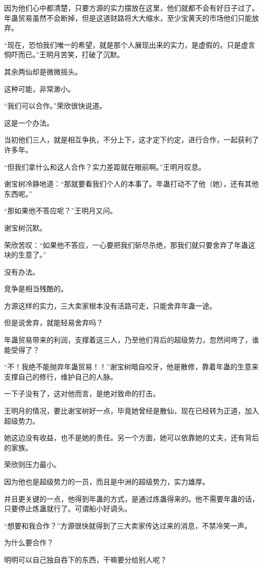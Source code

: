 \begin{this_body}
因为他们心中都清楚，只要方源的实力摆放在这里，他们就都不会有好日子过了。年蛊贸易虽然不会断掉，但是这道财路将大大缩水，至少宝黄天的市场他们只能放弃。

“现在，恐怕我们唯一的希望，就是那个人展现出来的实力，是虚假的。只是虚言恫吓而已。”王明月苦笑，打破了沉默。

其余两仙却是微微摇头。

这种可能，非常渺小。

“我们可以合作。”荣欣很快说道。

这是一个办法。

当初他们三人，就是相互争执，不分上下，这才定下约定，进行合作，一起获利了许多年。

“但我们拿什么和这人合作？实力差距就在眼前啊。”王明月叹息。

谢宝树冷静地道：“那就要看我们个人的本事了。年蛊打动不了他（她），还有其他东西呢。”

“那如果他不答应呢？”王明月又问。

谢宝树沉默。

荣欣苦叹：“如果他不答应，一心要把我们斩尽杀绝，那我们就只要舍弃了年蛊这块的生意了。”

没有办法。

竞争是相当残酷的。

方源这样的实力，三大卖家根本没有活路可走，只能舍弃年蛊一途。

但是说舍弃，就能轻易舍弃吗？

年蛊贸易带来的利润，支撑着这三人，乃至他们背后的超级势力，忽然间垮了，谁能受得了？

“不！我绝不能抛弃年蛊贸易！！”谢宝树暗自咬牙，他是散修，靠着年蛊的生意来支撑自己的修行，维护自己的人脉。

一下子没有了，这对他而言，是绝对致命的打击。

王明月的情况，要比谢宝树好一点，毕竟她曾经是散仙，现在已经转为正道，加入超级势力。

她这边没有收益，也不是她的责任。另一个方面，她可以依靠她的丈夫，还有背后的家族。

荣欣则压力最小。

因为他也是超级势力的一员，而且是中洲的超级势力，实力雄厚。

并且更关键的一点，他得到年蛊的方式，是通过炼蛊得来的。他不需要年蛊的话，只要停止炼蛊就行了。可谓船小好调头。

“想要和我合作？”方源很快就得到了三大卖家传达过来的消息，不禁冷笑一声。

为什么要合作？

明明可以自己独自吞下的东西，干嘛要分给别人呢？


\end{this_body}
